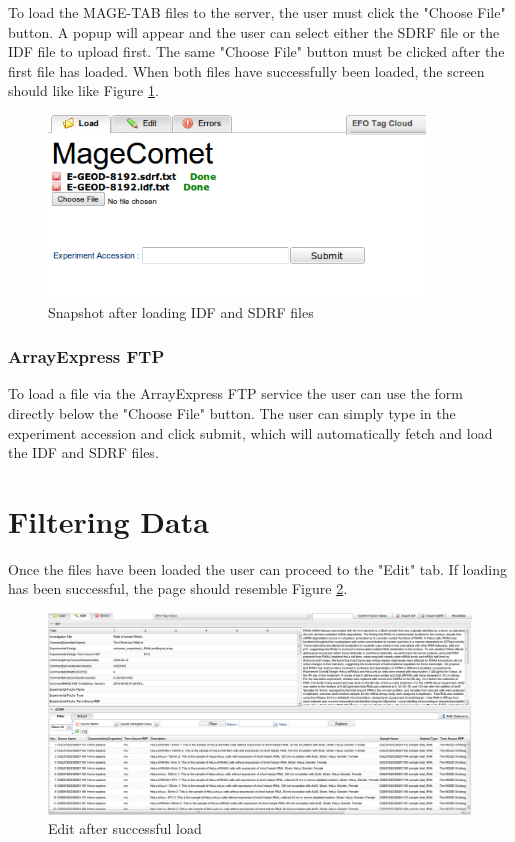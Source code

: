 \documentclass[a4paper]{article}
\begin{document}
To load the MAGE-TAB files to the server, the user must click the "Choose File" button. A popup will appear and the user can select either the SDRF file or the IDF file to upload first. The same "Choose File" button must be clicked after the first file has loaded. When both files have successfully been loaded, the screen should like like Figure \ref{load2}.

\begin{figure}[h]
\caption{Snapshot after loading IDF and SDRF files}
\centering
\label{load2}
\includegraphics[width=10cm]{images/Load2}
\end{figure}

\subsubsection*{ArrayExpress FTP}
To load a file via the ArrayExpress FTP service the user can use the form directly below the "Choose File" button. The user can simply type in the experiment accession and click submit, which will automatically fetch and load the IDF and SDRF files.

\section{Filtering Data}
Once the files have been loaded the user can proceed to the "Edit" tab. If loading has been successful, the page should resemble Figure \ref{edittab}.

\begin{figure}[h]
\caption{Edit after successful load}
\centering
\label{edittab}
\includegraphics[width=16cm]{images/Edit}
\end{figure}
\end{document}
